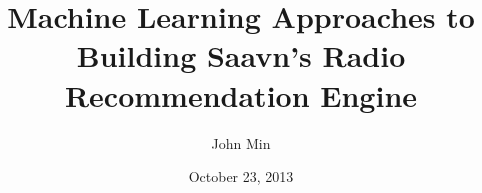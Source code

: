 \documentclass{article}
\begin{document}
\title{Machine Learning Approaches to Building Saavn's Radio Recommendation Engine}
\author{John Min}
\date{October 23, 2013}
\maketitle
\end{document}
